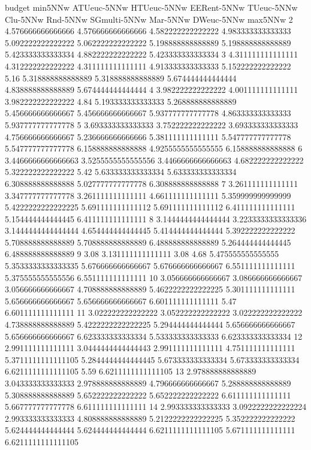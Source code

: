 budget min5NNw ATUeuc-5NNw HTUeuc-5NNw EERent-5NNw TUeuc-5NNw Clu-5NNw Rnd-5NNw SGmulti-5NNw Mar-5NNw DWeuc-5NNw max5NNw
2 4.576666666666666 4.576666666666666 4.582222222222222 4.983333333333333 5.092222222222222 5.062222222222222 5.198888888888889 5.198888888888889 5.423333333333334 4.882222222222222 5.423333333333334
3 4.311111111111111 4.312222222222222 4.311111111111111 4.913333333333333 5.152222222222222 5.16 5.318888888888889 5.318888888888889 5.674444444444444 4.838888888888889 5.674444444444444
4 3.982222222222222 4.001111111111111 3.982222222222222 4.84 5.193333333333333 5.268888888888889 5.456666666666667 5.456666666666667 5.937777777777778 4.863333333333333 5.937777777777778
5 3.693333333333333 3.752222222222222 3.693333333333333 4.756666666666667 5.236666666666666 5.381111111111111 5.547777777777778 5.547777777777778 6.158888888888888 4.9255555555555555 6.158888888888888
6 3.4466666666666663 3.5255555555555556 3.4466666666666663 4.682222222222222 5.322222222222222 5.42 5.633333333333334 5.633333333333334 6.308888888888888 5.027777777777778 6.308888888888888
7 3.261111111111111 3.347777777777778 3.261111111111111 4.661111111111111 5.359999999999999 5.4222222222222225 5.691111111111112 5.691111111111112 6.411111111111111 5.154444444444445 6.411111111111111
8 3.1444444444444444 3.2233333333333336 3.1444444444444444 4.654444444444445 5.414444444444444 5.392222222222222 5.708888888888889 5.708888888888889 6.488888888888889 5.264444444444445 6.488888888888889
9 3.08 3.131111111111111 3.08 4.68 5.475555555555555 5.3533333333333335 5.676666666666667 5.676666666666667 6.551111111111111 5.375555555555556 6.551111111111111
10 3.056666666666667 3.086666666666667 3.056666666666667 4.708888888888889 5.4622222222222225 5.301111111111111 5.656666666666667 5.656666666666667 6.601111111111111 5.47 6.601111111111111
11 3.022222222222222 3.052222222222222 3.022222222222222 4.738888888888889 5.4222222222222225 5.294444444444444 5.656666666666667 5.656666666666667 6.623333333333334 5.533333333333333 6.623333333333334
12 2.991111111111111 3.0444444444444443 2.991111111111111 4.751111111111111 5.3711111111111105 5.2844444444444445 5.673333333333334 5.673333333333334 6.6211111111111105 5.59 6.6211111111111105
13 2.978888888888889 3.043333333333333 2.978888888888889 4.796666666666667 5.288888888888889 5.308888888888889 5.652222222222222 5.652222222222222 6.611111111111111 5.667777777777778 6.611111111111111
14 2.993333333333333 3.0922222222222224 2.993333333333333 4.808888888888889 5.2122222222222225 5.352222222222222 5.624444444444444 5.624444444444444 6.6211111111111105 5.671111111111111 6.6211111111111105
